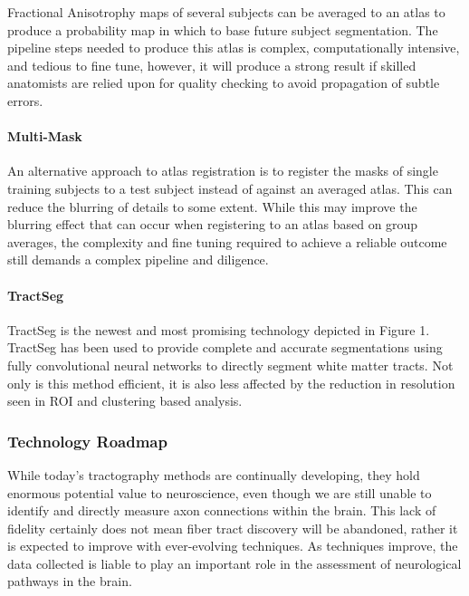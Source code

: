 Fractional Anisotrophy maps of several subjects can be averaged to an atlas to 
produce a probability map in which to base future subject segmentation.  The 
pipeline steps needed to produce this atlas is complex, computationally 
intensive, and tedious to fine tune, however, it will produce a strong result 
if skilled anatomists are relied upon for quality checking to avoid propagation 
of subtle errors\cite {wasserthal}.

\paragraph {Multi-Mask}

An alternative approach to atlas registration is to register the masks of single 
training subjects to a test subject instead of against an averaged atlas.  This 
can reduce the blurring of details to some extent.  While this may improve the 
blurring effect that can occur when registering to an atlas based on group 
averages, the complexity and fine tuning required to achieve a reliable outcome 
still demands a complex pipeline and diligence\cite {wasserthal}. 

\paragraph {TractSeg}

TractSeg is the newest and most promising technology depicted in Figure 1.  
TractSeg has been used to provide complete and accurate segmentations using 
fully convolutional neural networks to directly segment white matter tracts.  
Not only is this method efficient, it is also less affected by the reduction 
in resolution seen in ROI and clustering based analysis\cite {wasserthal}.

\subsubsection {Technology Roadmap}

While today’s tractography methods are continually developing, they hold 
enormous potential value to neuroscience, even though we are still 
unable to identify and directly measure axon connections within the brain.  
This lack of fidelity certainly does not mean fiber tract discovery will be 
abandoned, rather it is expected to improve with ever-evolving techniques.  As 
techniques improve, the data collected is liable to play an important role in 
the assessment of neurological pathways in the brain.

